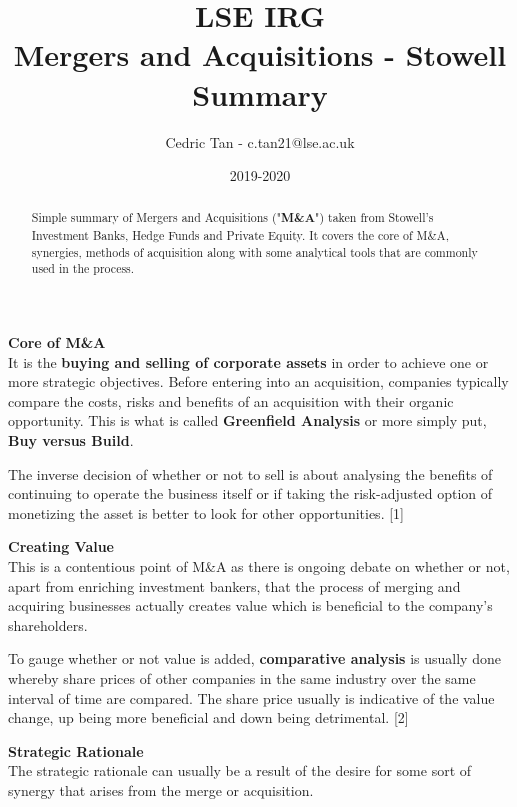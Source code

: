 \documentclass[10pt, a4paper]{article}
\title{LSE IRG\\
		Mergers and Acquisitions - Stowell Summary}
\author{Cedric Tan - c.tan21@lse.ac.uk}
\date {2019-2020}
\begin{document}
\maketitle

\begin{abstract}
	Simple summary of Mergers and Acquisitions ("\textbf{M\&A}") taken from Stowell's Investment Banks, Hedge Funds and Private Equity. It covers the core of M\&A, synergies, methods of acquisition along with some analytical tools that are commonly used in the process.
\end{abstract}

\newpage
\pagestyle{fancy}

\noindent \textbf{Core of M\&A}\\
It is the \textbf{buying and selling of corporate assets} in order to achieve one or more strategic objectives. Before entering into an acquisition, companies typically compare the costs, risks and benefits of an acquisition with their organic opportunity. This is what is called \textbf{Greenfield Analysis} or more simply put, \textbf{Buy versus Build}.

\vspace{5pt}
\noindent The inverse decision of whether or not to sell is about analysing the benefits of continuing to operate the business itself or if taking the risk-adjusted option of monetizing the asset is better to look for other opportunities. \hspace*{\fill} [1]

\vspace{10pt}
\noindent \textbf{Creating Value}\\
This is a contentious point of M\&A as there is ongoing debate on whether or not, apart from enriching investment bankers, that the process of merging and acquiring businesses actually creates value which is beneficial to the company's shareholders.

\vspace{5pt}
\noindent To gauge whether or not value is added, \textbf{comparative analysis} is usually done whereby share prices of other companies in the same industry over the same interval of time are compared. The share price usually is indicative of the value change, up being more beneficial and down being detrimental. \hspace*{\fill} [2]

\vspace{10pt}
\noindent \textbf{Strategic Rationale}\\
The strategic rationale can usually be a result of the desire for some sort of synergy that arises from the merge or acquisition.
\end{document}
